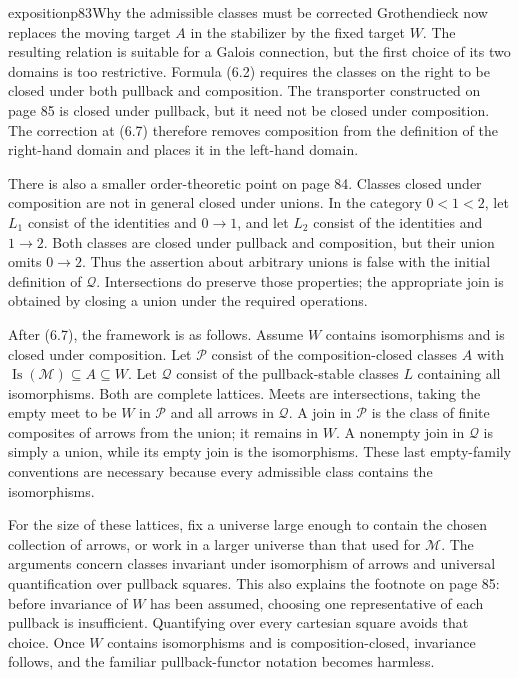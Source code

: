 \begin{dcomment}{exposition}{p83}{Why the admissible classes must be corrected}
Grothendieck now replaces the moving target $A$ in the stabilizer by the fixed target $W$. The resulting relation is suitable for a Galois connection, but the first choice of its two domains is too restrictive. Formula (6.2) requires the classes on the right to be closed under both pullback and composition. The transporter constructed on page 85 is closed under pullback, but it need not be closed under composition. The correction at (6.7) therefore removes composition from the definition of the right-hand domain and places it in the left-hand domain.

There is also a smaller order-theoretic point on page 84. Classes closed under composition are not in general closed under unions. In the category $0<1<2$, let $L_1$ consist of the identities and $0\to1$, and let $L_2$ consist of the identities and $1\to2$. Both classes are closed under pullback and composition, but their union omits $0\to2$. Thus the assertion about arbitrary unions is false with the initial definition of $\mathcal Q$. Intersections do preserve those properties; the appropriate join is obtained by closing a union under the required operations.

After (6.7), the framework is as follows. Assume $W$ contains isomorphisms and is closed under composition. Let $\mathcal P$ consist of the composition-closed classes $A$ with $\operatorname{Is}(\mathcal M)\subseteq A\subseteq W$. Let $\mathcal Q$ consist of the pullback-stable classes $L$ containing all isomorphisms. Both are complete lattices. Meets are intersections, taking the empty meet to be $W$ in $\mathcal P$ and all arrows in $\mathcal Q$. A join in $\mathcal P$ is the class of finite composites of arrows from the union; it remains in $W$. A nonempty join in $\mathcal Q$ is simply a union, while its empty join is the isomorphisms. These last empty-family conventions are necessary because every admissible class contains the isomorphisms.

For the size of these lattices, fix a universe large enough to contain the chosen collection of arrows, or work in a larger universe than that used for $\mathcal M$. The arguments concern classes invariant under isomorphism of arrows and universal quantification over pullback squares. This also explains the footnote on page 85: before invariance of $W$ has been assumed, choosing one representative of each pullback is insufficient. Quantifying over every cartesian square avoids that choice. Once $W$ contains isomorphisms and is composition-closed, invariance follows, and the familiar pullback-functor notation becomes harmless.
\end{dcomment}

